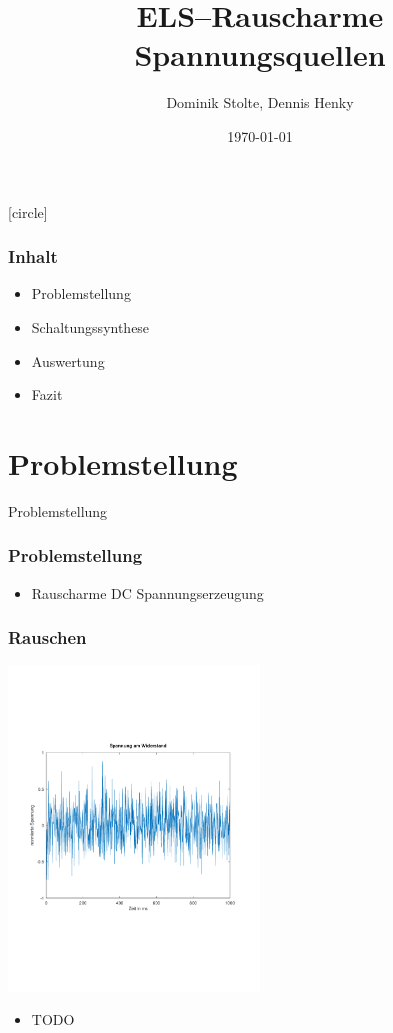 \documentclass[aspectratio=32]{beamer}
\title{ELS--Rauscharme Spannungsquellen}
\author{Dominik Stolte, Dennis Henky}
\institute[{Hochschule Mannheim}]{Hochschule Mannheim}
\date{\today}
\begin{document}
 
[circle]

\begin{frame}
  \titlepage{}
\end{frame}

\begin{frame}
  \frametitle{Inhalt}
  \begin{itemize}
    \item Problemstellung
    \item Schaltungssynthese
    \item Auswertung
    \item Fazit
  \end{itemize}
\end{frame}

\section{Problemstellung}
{
  \logo{}
  \begin{frame}
    \centering
    \Large{Problemstellung}
  \end{frame}
}

\begin{frame}
  \frametitle{Problemstellung}
  \centering
  \begin{itemize}
    \item Rauscharme DC Spannungserzeugung
  \end{itemize}
\end{frame}

\begin{frame}
  \frametitle{Rauschen}
  \centering
  \includegraphics[width=0.5\textwidth]{../common/Simulation/rauschen/spannung.pdf}
  \begin{itemize}
    \item TODO
  \end{itemize}
\end{frame}
\end{document}
